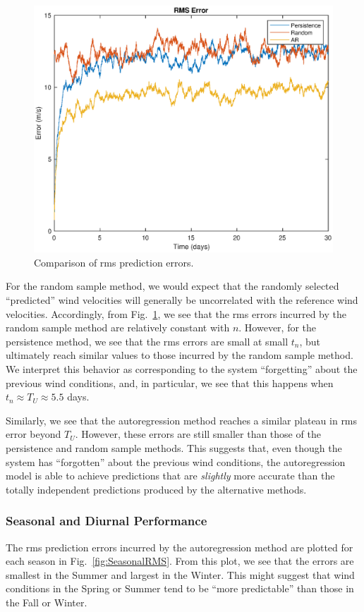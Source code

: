 \documentclass[11pt, oneside]{article}
\newcommand{\figref}[1]{Fig.~\ref{#1}}
\begin{document}
\begin{figure}[htb]
\centering
\includegraphics[width=\columnwidth]{figures/ComparisonRMSPredictionError}
\caption{Comparison of rms prediction errors.}
\label{fig:ComparisonRMS}
\end{figure}

For the random sample method, we would expect that the randomly selected ``predicted'' wind velocities will generally be uncorrelated with the reference wind velocities.
Accordingly, from \figref{fig:ComparisonRMS}, we see that the rms errors incurred by the random sample method are relatively constant with $n$.
However, for the persistence method, we see that the rms errors are small at small $t_n$, but ultimately reach similar values to those incurred by the random sample method.
We interpret this behavior as corresponding to the system ``forgetting'' about the previous wind conditions, and, in particular, we see that this happens when $t_n \approx T_U \approx 5.5$ days.

Similarly, we see that the autoregression method reaches a similar plateau in rms error beyond $T_U$.
However, these errors are still smaller than those of the persistence and random sample methods.
This suggests that, even though the system has ``forgotten'' about the previous wind conditions, the autoregression model is able to achieve predictions that are \textit{slightly} more accurate than the totally independent predictions produced by the alternative methods.

\subsubsection{Seasonal and Diurnal Performance}
The rms prediction errors incurred by the autoregression method are plotted for each season in \figref{fig:SeasonalRMS}.
From this plot, we see that the errors are smallest in the Summer and largest in the Winter.
This might suggest that wind conditions in the Spring or Summer tend to be ``more predictable'' than those in the Fall or Winter.
\end{document}
